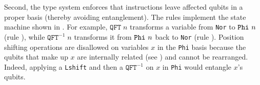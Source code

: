 Second, the type system enforces that instructions leave affected
qubits in a proper basis (thereby avoiding entanglement). The
rules implement the state machine shown in
. For example, $\texttt{QFT}\;n$ transforms a variable from \texttt{Nor} to
$\texttt{Phi}~{n}$ (rule ), while $\texttt{QFT}^{-1}\;n$
transforms it from $\texttt{Phi}~{n}$ back to \texttt{Nor} (rule
). Position shifting operations 
are disallowed on variables $x$ in
the \texttt{Phi} basis because the qubits that make up $x$ are
internally related (see ) and cannot be rearranged. Indeed, applying a
\texttt{Lshift} and then a $\texttt{QFT}^{-1}$ on $x$ in \texttt{Phi}
would entangle $x$'s qubits.

% 
% 
% 

